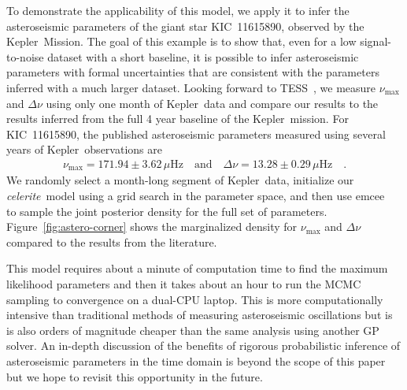 \documentclass[manuscript, letterpaper]{aastex6}
\newcommand{\project}[1]{\textsf{#1}}
\newcommand{\kepler}{\project{Kepler}}
\newcommand{\tess}{\project{TESS}}
\newcommand{\celeriteterm}{\emph{celerite}}
\newcommand{\emcee}{\project{emcee}}
\newcommand{\figureref}[1]{\ref{fig:#1}}
\newcommand{\Figure}[1]{Figure~\figureref{#1}}
\begin{document}
To demonstrate the applicability of this model, we apply it to infer the
asteroseismic parameters of the giant star KIC~11615890, observed by the
\kepler\ Mission.
The goal of this example is to show that, even for a low signal-to-noise
dataset with a short baseline, it is possible to infer asteroseismic
parameters with formal uncertainties that are consistent with the parameters
inferred with a much larger dataset.
Looking forward to \tess\ \citep{Ricker:2014,Campante:2016}, we measure
$\nu_\mathrm{max}$ and $\Delta\nu$ using only one month of \kepler\ data and
compare our results to the results inferred from the full 4 year baseline of
the \kepler\ mission.
For KIC~11615890, the published asteroseismic parameters measured using several
years of \kepler\ observations are \citep{Pinsonneault:2014}
\begin{eqnarray}
    \nu_\mathrm{max} = 171.94 \pm 3.62 \,\mu\mathrm{Hz} \quad\mathrm{and}\quad
    \Delta\nu = 13.28 \pm 0.29 \,\mu\mathrm{Hz} \quad.
\end{eqnarray}
We randomly select a month-long segment of \kepler\ data, initialize our
\celeriteterm\ model using a grid search in the parameter space, and then use
\emcee\ \citep{Foreman-Mackey:2013} to sample the joint posterior density for
the full set of parameters.
\Figure{astero-corner} shows the marginalized density for $\nu_\mathrm{max}$
and $\Delta\nu$ compared to the results from the literature.

This model requires about a minute of computation time to find the maximum
likelihood parameters and then it takes about an hour to run the MCMC sampling
to convergence on a dual-CPU laptop.
This is more computationally intensive than traditional methods of measuring
asteroseismic oscillations but is is also orders of magnitude cheaper than the
same analysis using another GP solver.
An in-depth discussion of the benefits of rigorous probabilistic inference of
asteroseismic parameters in the time domain is beyond the scope of this paper
but we hope to revisit this opportunity in the future.
\end{document}
